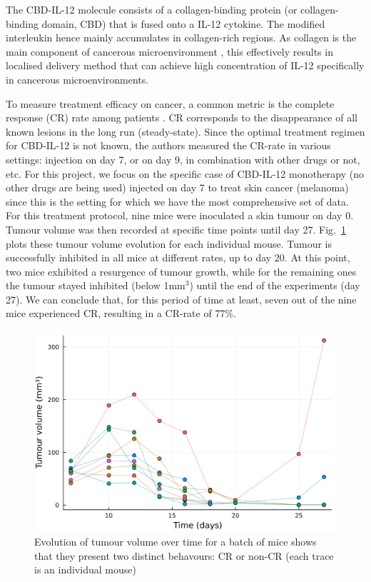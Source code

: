 \documentclass[11pt]{article}
\begin{document}
The CBD-IL-12  molecule consists of a collagen-binding protein (or collagen-binding domain, CBD) that is fused onto a IL-12 cytokine. The modified interleukin hence mainly accumulates in collagen-rich regions. As collagen is the main component of cancerous microenvironment \cite{collagenInCancer}, this effectively results in localised delivery method that can achieve high concentration of IL-12 specifically in cancerous microenvironments.

To measure treatment efficacy on cancer, a common metric is the complete response (CR) rate among patients \cite{cancMetric}. CR corresponds to the disappearance of all known lesions \cite{CRDef} in the long run (steady-state). Since the optimal treatment regimen for CBD-IL-12 is not known, the authors measured the CR-rate in various settings: injection on day 7, or on day 9, in combination with other drugs or not, etc. For this project, we focus on the specific case of CBD-IL-12 monotherapy (no other drugs are being used) injected on day 7 to treat skin cancer (melanoma) since this is the setting for which we have the most comprehensive set of data. For this treatment protocol, nine mice were inoculated a skin tumour on day 0. Tumour volume was then recorded at specific time points until day 27. Fig.~\ref{fig:outcomedual} plots these tumour volume evolution for each individual mouse. Tumour is successfully inhibited in all mice at different rates, up to day 20. At this point, two mice exhibited a resurgence of tumour growth, while for the remaining ones the tumour stayed inhibited (below 1mm$^3$) until the end of the experiments (day 27). We can conclude that, for this period of time at least, seven out of the nine mice experienced CR, resulting in a CR-rate of 77\%.

\begin{figure}[!ht]
    \centering\includegraphics[scale=0.3]{crnoncr3.png}
    \caption{Evolution of tumour volume over time for a batch of mice shows that they present two distinct behavours: CR or non-CR (each trace is an individual mouse)}
    \label{fig:outcomedual}
\end{figure}
\end{document}
